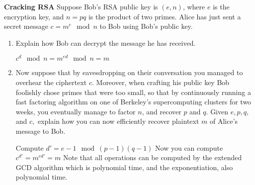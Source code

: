 \question \textbf{Cracking RSA}\newline
Suppose Bob's RSA public key is $(e, n)$, where $e$ is the encryption key, and $n = pq$ is the product of two primes. Alice has just sent a secret message $c = m^e \mod n$ to Bob using Bob’s public key.
\begin{enumerate}[label=(\alph*)]

\item Explain how Bob can decrypt the message he has received.
\begin{solution}
$c^d \mod n = m^{ed} \mod n = m$
\end{solution}

\item Now suppose that by eavesdropping on their conversation you managed to overhear the ciphertext $c$. Moreover, when crafting his public key Bob foolishly chose primes that were too small, so that by continuously running a fast factoring algorithm on one of Berkeley’s supercomputing clusters for two weeks, you eventually manage to factor $n$, and recover $p$ and $q$. Given $e, p, q,$ and $c,$ explain how you can now efficiently recover plaintext $m$ of Alice's message to Bob.
\begin{solution}
Compute $d' = e-1 \mod (p-1)(q-1)$
Now you can compute $c^{d'} = m^{ed'} = m$
Note that all operations can be computed by the extended GCD algorithm which is polynomial time, and the exponentiation, also polynomial time.
\end{solution}

\end{enumerate}